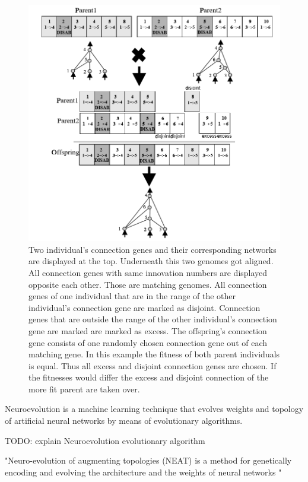   
  
\begin{figure}[tb]
	\centering
	\includegraphics[width=0.7\linewidth]{figures/NEAT/NEATCrossOver}
	\caption[NEAT cross over]{Two individual's connection genes and their corresponding networks are displayed at the top. Underneath this two genomes got aligned. All connection genes with same innovation numbers are displayed opposite each other. Those are matching genomes. All connection genes of one individual that are in the range of the other individual's connection gene are marked as disjoint. Connection genes that are outside the range of the other individual's connection gene are marked are marked as excess. The offspring's connection gene consists of one randomly chosen connection gene out of each matching gene. In this example the fitness of both parent individuals is equal. Thus all excess and disjoint connection genes are chosen. If the fitnesses would differ the excess and disjoint connection of the more fit parent are taken over.\cite[p. 109]{NEAT}}
	\label{fig:neatcrossover}
\end{figure}
  
  
Neuroevolution is a machine learning technique that evolves weights and topology of artificial neural networks by means of evolutionary algorithms. 

TODO: explain 
Neuroevolution
evolutionary algorithm


"Neuro-evolution of augmenting topologies (NEAT) is a method for genetically encoding and evolving the architecture and the weights of neural networks "

